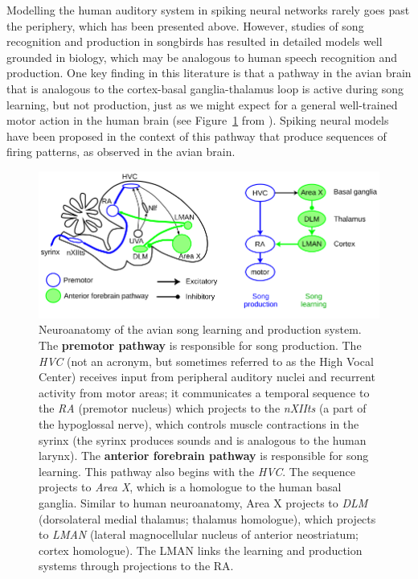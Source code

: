 \documentclass{article}
\begin{document}
Modelling the human auditory system
in spiking neural networks
rarely goes past the periphery,
which has been presented above.
However, studies of
song recognition and production
in songbirds has resulted in
detailed models well grounded in biology,
which may be analogous
to human speech recognition and production.
One key finding in this literature
is that a pathway in the avian brain
that is analogous to
the cortex-basal ganglia-thalamus loop
is active during song learning,
but not production,
just as we might expect
for a general well-trained motor action
in the human brain
(see Figure~\ref{fig:birdsong} from \citealp{fiete2008}).
Spiking neural models have been proposed
in the context of this pathway
that produce sequences of firing patterns,
as observed in the avian brain.

\begin{figure}
  \begin{center}
    \includegraphics[width=0.85\linewidth]{birdsong}
  \end{center}
  \caption{Neuroanatomy of the avian song learning and production system.
    The \textbf{premotor pathway} is responsible for song production.
    The \textit{HVC} (not an acronym, but sometimes referred to as the
    High Vocal Center) receives input from peripheral auditory nuclei
    and recurrent activity from motor areas;
    it communicates a temporal sequence to the
    \textit{RA} (premotor nucleus) which projects to the
    \textit{nXIIts} (a part of the hypoglossal nerve),
    which controls muscle contractions in the syrinx
    (the syrinx produces sounds and is analogous
    to the human larynx).
    The \textbf{anterior forebrain pathway} is responsible for
    song learning.
    This pathway also begins with the \textit{HVC}.
    The sequence projects to \textit{Area X},
    which is a homologue to the human basal ganglia.
    Similar to human neuroanatomy,
    Area X projects to \textit{DLM}
    (dorsolateral medial thalamus; thalamus homologue),
    which projects to \textit{LMAN}
    (lateral magnocellular nucleus of anterior neostriatum;
    cortex homologue).
    The LMAN links the learning and production systems
    through projections to the RA.}
  \label{fig:birdsong}
\end{figure}
\end{document}
